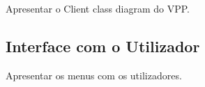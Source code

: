 \documentclass[relatorio.tex]{subfiles}
\begin{document}
    
Apresentar o Client class diagram do VPP.

\subsection{Interface com o Utilizador}

Apresentar os menus com os utilizadores.
\end{document}
